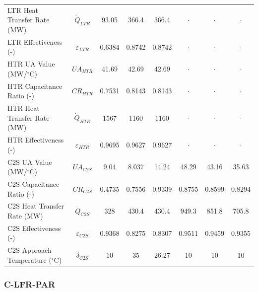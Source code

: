 \begin{paracol}{2}
\begin{specialtable}[H]
{\begin{tabular}{lc|c|cc|ccc}
    LTR Heat Transfer Rate (MW)	&	$\dot{Q}_{LTR}$	&	93.05	&	366.4	&	366.4	&	$\cdot$	&	$\cdot$	&	$\cdot$	\\
    LTR Effectiveness (-)	&	$\varepsilon_{LTR}$	&	0.6384	&	0.8742	&	0.8742	&	$\cdot$	&	$\cdot$	&	$\cdot$	\\
    HTR UA Value (MW/$^{\circ}$C)	&	$UA_{HTR}$	&	41.69	&	42.69	&	42.69	&	$\cdot$	&	$\cdot$	&	$\cdot$	\\
    HTR Capacitance Ratio (-)	&	$CR_{HTR}$	&	0.7531	&	0.8143	&	0.8143	&	$\cdot$	&	$\cdot$	&	$\cdot$	\\
    HTR Heat Transfer Rate (MW)	&	$\dot{Q}_{HTR}$	&	1567	&	1160	&	1160	&	$\cdot$	&	$\cdot$	&	$\cdot$	\\
    HTR Effectiveness (-)	&	$\varepsilon_{HTR}$	&	0.9695	&	0.9627	&	0.9627	&	$\cdot$	&	$\cdot$	&	$\cdot$	\\
    C2S UA Value (MW/$^{\circ}$C)	&	$UA_{C2S}$	&	9.04	&	8.037	&	14.24	&	48.29	&	43.16	&	35.63	\\
    C2S Capacitance Ratio (-)	&	$CR_{C2S}$	&	0.4735	&	0.7556	&	0.9339	&	0.8755	&	0.8599	&	0.8294	\\
    C2S Heat Transfer Rate (MW)	&	$\dot{Q}_{C2S}$	&	328	&	430.4	&	430.4	&	949.3	&	851.8	&	705.8	\\
    C2S Effectiveness (-)	&	$\varepsilon_{C2S}$	&	0.9368	&	0.8275	&	0.8307	&	0.9511	&	0.9459	&	0.9355	\\
    C2S Approach Temperature ($^{\circ}$C)	&	$\delta_{C2S}$	&	10	&	35	&	26.27	&	10	&	10	&	10	\\
    \bottomrule
    \end{tabular}
    }
\end{specialtable}


\subsubsection{C-LFR-PAR}


\end{paracol}
